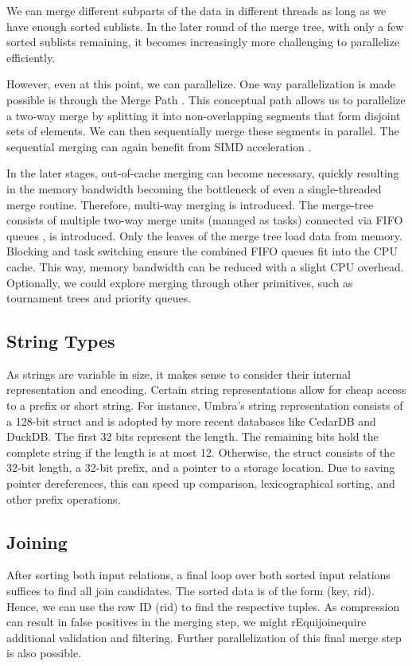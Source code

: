 We can merge different subparts of the data in
different threads as long as we have enough sorted sublists. In the later round of the merge tree,
with only a few sorted sublists remaining, it becomes increasingly more challenging to parallelize
efficiently. 

However, even at this point, we can parallelize. One way parallelization is made possible 
is through the Merge Path \cite{MergePath}. This conceptual path allows us to parallelize a two-way merge by splitting
it into non-overlapping segments that form disjoint sets of elements. We can then sequentially
merge these segments in parallel. The sequential merging can again benefit from SIMD acceleration \cite{Watkins}.

In the later stages, out-of-cache merging can become necessary, quickly resulting in the memory
bandwidth becoming the bottleneck of even a single-threaded merge routine.  Therefore, multi-way
merging \cite{Balkesen} is introduced. The merge-tree consists of multiple two-way merge units (managed as tasks) connected via FIFO queues
, is introduced. Only the leaves of the merge tree load data from memory. Blocking and task switching 
ensure the combined FIFO queues fit into the CPU cache. This way, memory bandwidth can be reduced
with a slight CPU overhead. Optionally, we could explore merging through other primitives, such as
tournament trees and priority queues. 


\subsection{String Types}

As strings are variable in size, it makes sense to consider their internal representation and
encoding. Certain string representations allow for cheap access to a prefix or short string.
For instance, Umbra's string representation \cite{DBLP:conf/cidr/NeumannF20} consists of a 128-bit 
struct and is adopted by more recent databases like CedarDB and DuckDB. The first 32 bits represent 
the length. The remaining bits hold
the complete string if the length is at most 12. Otherwise, the struct consists of the 32-bit
length, a 32-bit prefix, and a pointer to a storage location. Due to saving pointer dereferences,
this can speed up comparison, lexicographical sorting, and other prefix operations.


\subsection{Joining}

After sorting both input relations, a final loop over both sorted input relations suffices to find all
join candidates. The sorted data is of the form (key, rid). Hence, we can use the row ID (rid) to
find the respective tuples. As compression can result in false positives in the merging step, we
might rEquijoinequire additional validation and 
filtering. Further parallelization of this final merge step is also possible.

